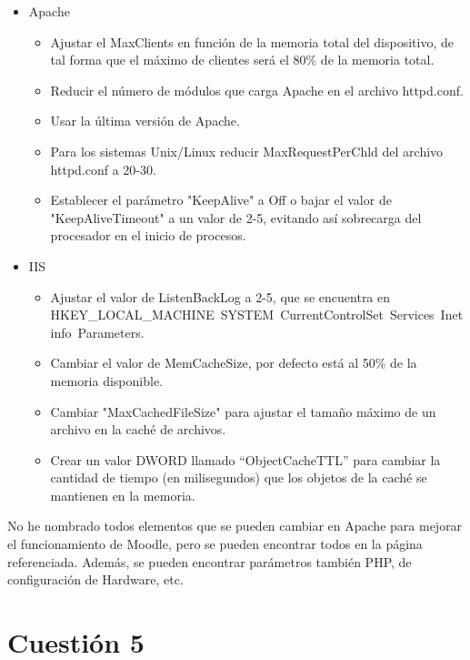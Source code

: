 \begin{itemize}
	\item \Large Apache
		\begin{itemize}
			\item Ajustar el MaxClients en función de la memoria total del dispositivo, de tal forma que el máximo de clientes será el 80\% de la memoria total.
			\item Reducir el número de módulos que carga Apache en el archivo httpd.conf.
			\item Usar la última versión de Apache.
			\item Para los sistemas Unix/Linux reducir MaxRequestPerChld del archivo httpd.conf a 20-30.
			\item Establecer el parámetro "KeepAlive" a Off o bajar el valor de "KeepAliveTimeout" a un valor de 2-5, evitando así sobrecarga del procesador en el inicio de procesos.
		\end{itemize}
	
	\item \Large IIS
	
		\begin{itemize}
			\item Ajustar el valor de ListenBackLog a 2-5, que se encuentra en HKEY\_LOCAL\_MACHINE\ SYSTEM\ CurrentControlSet\ Services\ Inetinfo\ Parameters.
			\item Cambiar el valor de MemCacheSize, por defecto está al 50\% de la memoria disponible.
			\item Cambiar "MaxCachedFileSize" para ajustar el tamaño máximo de un archivo en la caché de archivos.
			\item Crear un valor DWORD llamado “ObjectCacheTTL” para cambiar la cantidad de tiempo (en milisegundos) que los objetos de la caché se mantienen en la memoria.
		\end{itemize}
\end{itemize}


No he nombrado todos elementos que se pueden cambiar en Apache para mejorar el funcionamiento de Moodle, pero se pueden encontrar todos en la página referenciada. \cite{moodle} Además, se pueden encontrar parámetros también PHP, de configuración de Hardware, etc.


\section{Cuestión 5}

